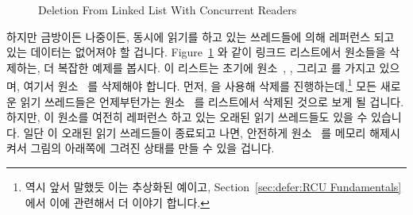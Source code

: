 \begin{figure}[tb]
\begin{center}
\end{center}
\caption{Deletion From Linked List With Concurrent Readers}
\label{fig:defer:Deletion From Linked List With Concurrent Readers}
\end{figure}

하지만 금방이든 나중이든, 동시에 읽기를 하고 있는 쓰레드들에 의해 레퍼런스 되고
있는 데이터는 없어져야 할 겁니다.
Figure~\ref{fig:defer:Deletion From Linked List With Concurrent Readers} 와
같이 링크드 리스트에서 원소들을 삭제하는, 더 복잡한 예제를 봅시다.
이 리스트는 초기에 원소~, , 그리고  를 가지고 있으며, 여기서
원소~ 를 삭제해야 합니다.
먼저,  을 사용해 삭제를 진행하는데,\footnote{
	역시 앞서 말했듯 이는 추상화된 예이고,
	Section~\ref{sec:defer:RCU Fundamentals} 에서 이에 관련해서 더 이야기
합니다.}
모든 새로운 읽기 쓰레드들은 언제부턴가는 원소~ 를 리스트에서 삭제된
것으로 보게 될 겁니다.
하지만, 이 원소를 여전히 레퍼런스 하고 있는 오래된 읽기 쓰레드들도 있을 수
있습니다.
일단 이 오래된 읽기 쓰레드들이 종료되고 나면, 안전하게 원소~ 를 메모리
해제시켜서 그림의 아래쪽에 그려진 상태를 만들 수 있을 겁니다.
\iffalse

